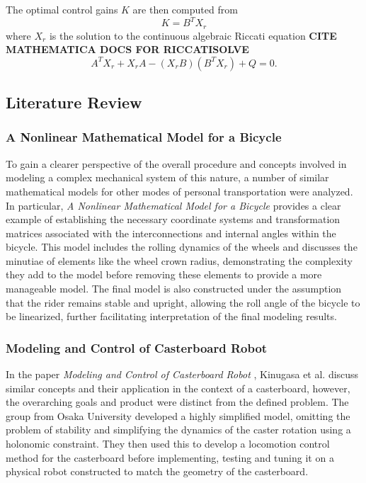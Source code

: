 The optimal control gains $K$ are then computed from
\begin{equation}
K = B^{T}X_{r}
\end{equation}
where  $X_{r}$ is the solution to the continuous algebraic Riccati equation \textbf{CITE MATHEMATICA DOCS FOR RICCATISOLVE}
\begin{equation}
A^{T}X_{r} + X_{r}A - (X_{r}B)(B^{T}X_{r}) + Q = 0.
\end{equation}

\subsection{Literature Review}
\subsubsection{A Nonlinear Mathematical Model for a Bicycle}
To gain a clearer perspective of the overall procedure and concepts involved in modeling a complex mechanical system of this nature, a number of similar mathematical models for other modes of personal transportation were analyzed.
In particular, \textit{A Nonlinear Mathematical Model for a Bicycle} \cite{BikeModel} provides a clear example of establishing the necessary coordinate systems and transformation matrices associated with the interconnections and internal angles within the bicycle.
This model includes the rolling dynamics of the wheels and discusses the minutiae of elements like the wheel crown radius, demonstrating the complexity they add to the model before removing these elements to provide a more manageable model.
The final model is also constructed under the assumption that the rider remains stable and upright, allowing the roll angle of the bicycle to be linearized, further facilitating interpretation of the final modeling results. 

\subsubsection{Modeling and Control of Casterboard Robot}
In the paper \textit{Modeling and Control of Casterboard Robot} \cite{CasterboardRobot}, Kinugasa et al. discuss similar concepts and their application in the context of a casterboard, however, the overarching goals and product were distinct from the defined problem.
The group from Osaka University developed a highly simplified model, omitting the problem of stability and simplifying the dynamics of the caster rotation using a holonomic constraint. 
They then used this to develop a locomotion control method for the casterboard before implementing, testing and tuning it on a physical robot constructed to match the geometry of the casterboard.

